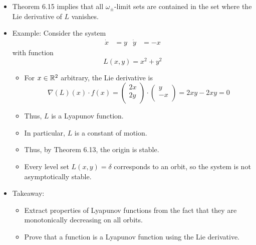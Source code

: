 \documentclass[../notes.tex]{subfiles}
\begin{document}
\begin{itemize}
    \item Theorem 6.15 implies that all $\omega_\pm$-limit sets are contained in the set where the Lie derivative of $L$ vanishes.
    \item Example: Consider the system
    \begin{align*}
        \dot{x} &= y&
        \dot{y} &= -x
    \end{align*}
    with function
    \begin{equation*}
        L(x,y) = x^2+y^2
    \end{equation*}
    \begin{itemize}
        \item For $x\in\mathbb{R}^2$ arbitrary, the Lie derivative is
        \begin{equation*}
            \nabla(L)(x)\cdot f(x) =
            \begin{pmatrix}
                2x\\
                2y\\
            \end{pmatrix}
            \cdot
            \begin{pmatrix}
                y\\
                -x\\
            \end{pmatrix}
            = 2xy-2xy
            = 0
        \end{equation*}
        \item Thus, $L$ is a Lyapunov function.
        \item In particular, $L$ is a constant of motion.
        \item Thus, by Theorem 6.13, the origin is stable.
        \item Every level set $L(x,y)=\delta$ corresponds to an orbit, so the system is not asymptotically stable.
    \end{itemize}
    \item Takeaway:
    \begin{itemize}
        \item Extract properties of Lyapunov functions from the fact that they are monotonically decreasing on all orbits.
        \item Prove that a function is a Lyapunov function using the Lie derivative.
    \end{itemize}
\end{itemize}
\end{document}
